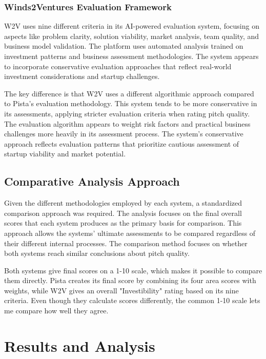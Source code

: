 \subsubsection{Winds2Ventures Evaluation Framework}

W2V uses nine different criteria in its AI-powered evaluation system, focusing on aspects like problem clarity, solution viability, market analysis, team quality, and business model validation. The platform uses automated analysis trained on investment patterns and business assessment methodologies. The system appears to incorporate conservative evaluation approaches that reflect real-world investment considerations and startup challenges.

The key difference is that W2V uses a different algorithmic approach compared to Pista's evaluation methodology. This system tends to be more conservative in its assessments, applying stricter evaluation criteria when rating pitch quality. The evaluation algorithm appears to weight risk factors and practical business challenges more heavily in its assessment process. The system's conservative approach reflects evaluation patterns that prioritize cautious assessment of startup viability and market potential.

\subsection{Comparative Analysis Approach}
\label{subsec:methodology-approach}

Given the different methodologies employed by each system, a standardized comparison approach was required. The analysis focuses on the final overall scores that each system produces as the primary basis for comparison. This approach allows the systems' ultimate assessments to be compared regardless of their different internal processes. The comparison method focuses on whether both systems reach similar conclusions about pitch quality.

Both systems give final scores on a 1-10 scale, which makes it possible to compare them directly. Pista creates its final score by combining its four area scores with weights, while W2V gives an overall "Investibility" rating based on its nine criteria. Even though they calculate scores differently, the common 1-10 scale lets me compare how well they agree.

\section{Results and Analysis}
\label{sec:inter-rater-reliability}

